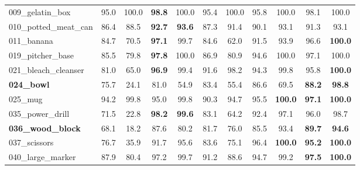 \documentclass[10pt,twocolumn,letterpaper]{article}
\begin{document}
\begin{table*}
\begin{tabular}{l|c|c|c|c|c|c|c|c|c|c}
009\_gelatin\_box        & 95.0      & 100.0               & \textbf{98.8}  & 100.0          & 95.4       & 100.0                & 95.8         & 100.0                  & 98.1             & 100.0             \\
010\_potted\_meat\_can   & 86.4      & 88.5                & \textbf{92.7}  & \textbf{93.6}  & 87.3       & 91.4                 & 90.1         & 93.1                   & 91.3             & 93.1              \\
011\_banana              & 84.7      & 70.5                & \textbf{97.1}  & 99.7           & 84.6       & 62.0                 & 91.5         & 93.9                   & 96.6             & \textbf{100.0}    \\
019\_pitcher\_base       & 85.5      & 79.8                & \textbf{97.8}  & 100.0          & 86.9       & 80.9                 & 94.6         & 100.0                  & 97.1             & 100.0             \\
021\_bleach\_cleanser    & 81.0      & 65.0                & \textbf{96.9}  & 99.4           & 91.6       & 98.2                 & 94.3         & 99.8                   & 95.8             & \textbf{100.0}    \\
\textbf{024\_bowl}                & 75.7      & 24.1                & 81.0           & 54.9           & 83.4       & 55.4                 & 86.6         & 69.5                   & \textbf{88.2}    & \textbf{98.8}     \\
025\_mug                 & 94.2      & 99.8                & 95.0           & 99.8           & 90.3       & 94.7                 & 95.5         & \textbf{100.0}         & \textbf{97.1}    & \textbf{100.0}    \\
035\_power\_drill        & 71.5      & 22.8                & \textbf{98.2}  & \textbf{99.6}  & 83.1       & 64.2                 & 92.4         & 97.1                   & 96.0             & 98.7              \\
\textbf{036\_wood\_block}         & 68.1      & 18.2                & 87.6           & 80.2           & 81.7       & 76.0                 & 85.5         & 93.4                   & \textbf{89.7}    & \textbf{94.6}     \\
037\_scissors            & 76.7      & 35.9                & 91.7           & 95.6           & 83.6       & 75.1                 & 96.4         & \textbf{100.0}         & \textbf{95.2}    & \textbf{100.0}    \\
040\_large\_marker       & 87.9      & 80.4                & 97.2           & 99.7           & 91.2       & 88.6                 & 94.7         & 99.2                   & \textbf{97.5}    & \textbf{100.0}    \\

\end{tabular}
\end{table*}
\end{document}
